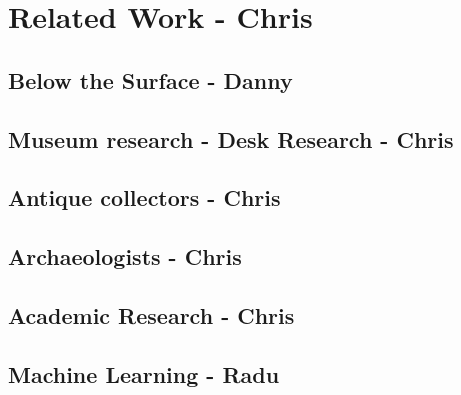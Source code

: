 \section{Related Work - Chris}

\subsection{Below the Surface - Danny}

\subsection{Museum research - Desk Research - Chris}

\subsection{Antique collectors - Chris}

\subsection{Archaeologists - Chris}

\subsection{Academic Research - Chris}

\subsection{Machine Learning - Radu}


